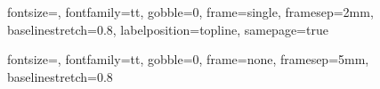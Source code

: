 
%
    {fontsize=\small,
    fontfamily=tt,
    gobble=0,
    frame=single,
    framesep=2mm,
    baselinestretch=0.8,
    labelposition=topline,
    samepage=true}

%
    {fontsize=\small,
    fontfamily=tt,
    gobble=0,
    frame=none,
    framesep=5mm,
    baselinestretch=0.8}

\newcommand{\sym}{\mathcal}
\newcommand*\Let[2]{\State #1 $\gets$ #2}
\newcommand{\func}[2]{\textbf{fn}(#1)\{#2\}}


\algrenewcommand{}
\algrenewcommand{}

\newcommand{\R}[1]{\colorbox{black!15}{\texttt{#1}}}
\newcommand{\cmdline}[1]{\colorbox{black!15}{\texttt{#1}}}



\theoremstyle{definition}
\newtheorem{exmp}{Example}[section]


\newcommand{\insertref}[1]{\todo[color=green!40,fancyline]{cite #1}}
\newcommand{\tow}[1]{\todo[inline]{write #1}}
\newcommand{\hmm}[1]{\todo[fancyline]{#1}}

\newcommand{\eg}{\todo[fancyline]{add examples}}
\newcommand{\WIP}{\todo[color=blue!40,inline]{Work in progress}}



